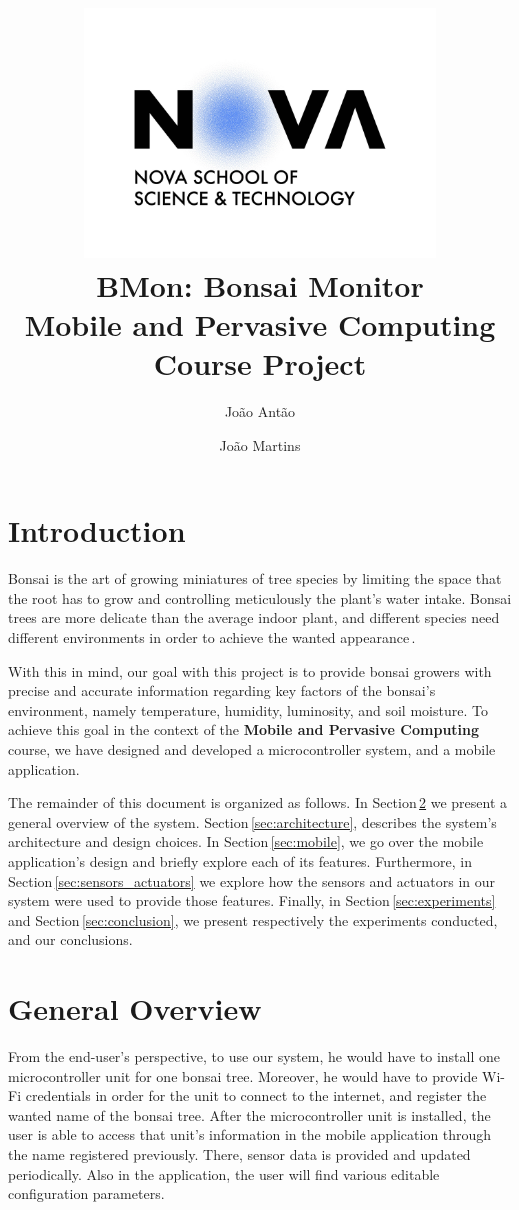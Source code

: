 \documentclass{article}
\title{\textbf{\includegraphics[width=0.7\textwidth]{figures/logo}\\
    \vspace{4 cm}
    BMon: Bonsai Monitor}\\  
    \vspace{2 mm}
    Mobile and Pervasive Computing Course Project}
\author{João Antão \and João Martins}
\begin{document}
\maketitle
\vspace{2 cm}
\newpage
\tableofcontents
\newpage

\section{Introduction}
Bonsai is  the art of growing miniatures of tree species by limiting the space
that the root has to grow and controlling meticulously the plant’s water intake.
Bonsai trees are more delicate than the average indoor plant, and different
species need different environments in order to achieve the wanted
appearance\,\cite{bonsai_care}. 

With this in mind, our goal with this project is to provide bonsai growers with
precise and accurate information regarding key factors of the bonsai's
environment, namely temperature, humidity, luminosity, and soil moisture. To
achieve this goal in the context of the \textbf{Mobile and Pervasive Computing}
course, we have designed and developed a microcontroller system, and a mobile
application.

The remainder of this document is organized as follows. In
Section\,\ref{sec:overview} we present a general overview of the system.
Section\,\ref{sec:architecture}, describes the system's  architecture and design
choices. In Section\,\ref{sec:mobile}, we go over the mobile application's
design and briefly explore each of its features. Furthermore, in
Section\,\ref{sec:sensors_actuators} we explore how the sensors and actuators in
our system were used to provide those features. Finally, in
Section\,\ref{sec:experiments} and Section\,\ref{sec:conclusion}, we present
respectively the experiments conducted, and our conclusions.


\section{General Overview}\label{sec:overview}
From the end-user's perspective, to use our system, he would have to install one
microcontroller unit for one bonsai tree. Moreover, he would have to provide
Wi-Fi credentials in order for the unit to connect to the internet, and register
the wanted name of the bonsai tree. After the microcontroller unit is installed,
the user is able to access that unit's information in the mobile application
through the name registered previously. There, sensor data is provided and
updated periodically. Also in the application, the user will find various
editable configuration parameters.
\end{document}
